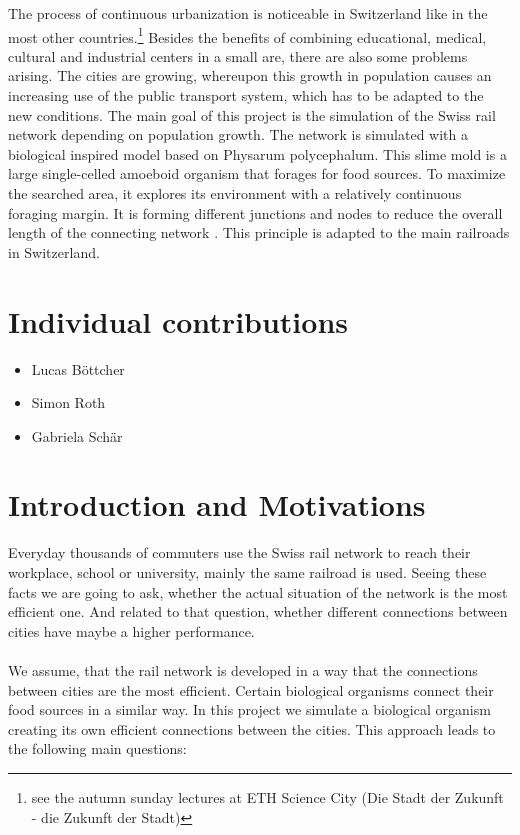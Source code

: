 \documentclass[11pt]{scrartcl}
\begin{document}
The process of continuous urbanization is noticeable in Switzerland like in the most other countries.\footnote[1]{see the autumn sunday lectures at ETH Science City (Die Stadt der Zukunft - die Zukunft der Stadt)} Besides the benefits of combining educational, medical, cultural and industrial centers in a small are, there are also some problems arising. The cities are growing, whereupon this growth in population causes an increasing use of the public transport system, which has to be adapted to the new conditions. The main goal of this project is the simulation of the Swiss rail network depending on population growth. The network is simulated with a biological inspired model based on Physarum polycephalum. This slime mold is a large single-celled amoeboid organism that forages for food sources. To maximize the searched area, it explores its environment with a relatively continuous foraging margin. It is forming different junctions and nodes to reduce the overall length of the connecting network \cite{network_tokyo}. This principle is adapted to the main railroads in Switzerland. 


\section{Individual contributions}
\begin{itemize}
  \item Lucas Böttcher
  \item Simon Roth
  \item Gabriela Schär
\end{itemize}


\section{Introduction and Motivations}
Everyday thousands of commuters use the Swiss rail network to reach their workplace, school or university, mainly the same railroad is used. Seeing these facts we are going to ask, whether the actual situation of the network is the most efficient one. And related to that question, whether different connections between cities have maybe a higher performance.\\\\
We assume, that the rail network is developed in a way that the connections between cities are the most efficient. Certain biological organisms connect their food sources in a similar way. In this project we simulate a biological organism creating its own efficient connections between the cities. This approach leads to the following main questions:
\end{document}
